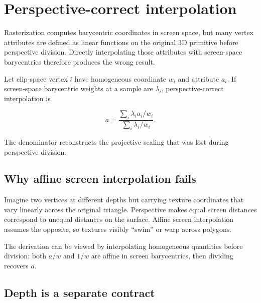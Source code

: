 \hypertarget{appendix-1ed5f96c73ea}{}\label{referencestart:appendix-1ed5f96c73ea}
\section{Perspective-correct interpolation}\label{appendix-1ed5f96c73ea-perspective-correct-interpolation}

\hypertarget{appendix-1ed5f96c73ea-perspective-correct-interpolation}{}

Rasterization computes barycentric coordinates in screen space, but many vertex attributes are defined as linear functions on the original 3D primitive before perspective division. Directly interpolating those attributes with screen-space barycentrics therefore produces the wrong result.

Let clip-space vertex \(i\) have homogeneous coordinate \(w_i\) and attribute \(a_i\). If screen-space barycentric weights at a sample are \(\lambda_i\), perspective-correct interpolation is

\[
a=
\frac{
\sum_i \lambda_i a_i/w_i
}{
\sum_i \lambda_i /w_i
}.
\]

The denominator reconstructs the projective scaling that was lost during perspective division.

\subsection{Why affine screen interpolation fails}\label{appendix-1ed5f96c73ea-why-affine-screen-interpolation-fails}

\hypertarget{appendix-1ed5f96c73ea-why-affine-screen-interpolation-fails}{}

Imagine two vertices at different depths but carrying texture coordinates that vary linearly across the original triangle. Perspective makes equal screen distances correspond to unequal distances on the surface. Affine screen interpolation assumes the opposite, so textures visibly ``swim'' or warp across polygons.

The derivation can be viewed by interpolating homogeneous quantities before division: both \(a/w\) and \(1/w\) are affine in screen barycentrics, then dividing recovers \(a\).

\subsection{Depth is a separate contract}\label{appendix-1ed5f96c73ea-depth-is-a-separate-contract}

